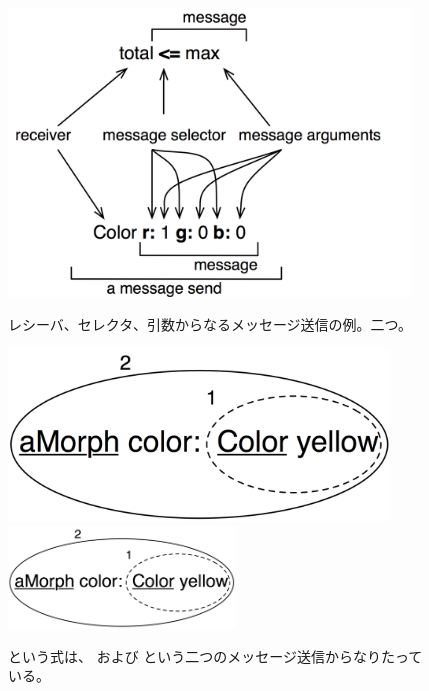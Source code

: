 \documentclass[a4paper,10pt,twoside]{book}
\begin{document}
\begin{figure}[htb]
\begin{minipage}{0.53\textwidth}
	\begin{center}
	\includegraphics[width=0.95\textwidth]{message}
	\caption{レシーバ、セレクタ、引数からなるメッセージ送信の例。二つ。}\end{center}
\end{minipage}
\hfill
\begin{minipage}{0.43\textwidth}
	\begin{center}
	\ifluluelse
		{\includegraphics[width=0.9\textwidth]{uKeyUnOne}}
		{\includegraphics[width=6cm]{uKeyUnOne}}
	\caption{ という式は、 および  という二つのメッセージ送信からなりたっている。}
	\end{center}
\end{minipage}
\end{figure}
\end{document}

